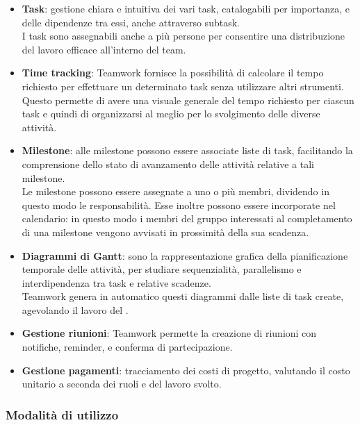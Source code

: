 \begin{itemize}
	\item \textbf{Task}:
	gestione chiara e intuitiva dei vari task, catalogabili per importanza, e delle dipendenze tra essi, anche attraverso subtask.\\
	I task sono assegnabili anche a più persone per consentire una distribuzione del lavoro efficace all'interno del team.
	
	\item \textbf{Time tracking}:
	Teamwork fornisce la possibilità di calcolare il tempo richiesto per effettuare un determinato task senza utilizzare altri strumenti. Questo permette di avere una visuale generale del tempo richiesto per ciascun task e quindi di organizzarsi al meglio per lo svolgimento delle diverse attività.
	
	\item \textbf{Milestone}:
	alle milestone possono essere associate liste di task, facilitando la comprensione dello stato di avanzamento delle attività relative a tali milestone.\\
	Le milestone possono essere assegnate a uno o più membri, dividendo in questo modo le responsabilità. Esse inoltre possono essere incorporate nel calendario: in questo modo i membri del gruppo interessati al completamento di una milestone vengono avvisati in prossimità della sua scadenza.
	
	\item \textbf{Diagrammi di Gantt}:	
	sono la rappresentazione grafica della pianificazione temporale delle attività, per studiare sequenzialità, parallelismo e interdipendenza tra task e relative scadenze.\\
	Teamwork genera in automatico questi diagrammi dalle liste di task create, agevolando il lavoro del \Responsabile.
	
	\item \textbf{Gestione riunioni}:
	Teamwork permette la creazione di riunioni con notifiche, reminder, e conferma di partecipazione.
	
	\item \textbf{Gestione pagamenti}:
	tracciamento dei costi di progetto, valutando il costo unitario a seconda dei ruoli e del lavoro svolto.
\end{itemize}

\subsubsection{Modalità di utilizzo} \label{sec:procedure_teamwork}

